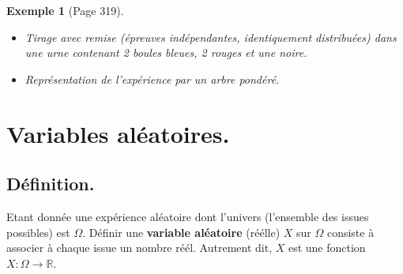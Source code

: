 \documentclass[a4paper,11pt]{article}
\theoremstyle{break}
\newcounter{enonce}
\newtheorem{exemple}[enonce]{Exemple}
\begin{document}
    \begin{exemple}[Page 319]
   
   \begin{itemize}
    \item Tirage avec remise (épreuves indépendantes, identiquement distribuées)
    dans une urne contenant 2 boules bleues, 2 rouges et une noire.

  \item Représentation de l'expérience par un arbre pondéré.

   \end{itemize}
  \end{exemple}

 \section{Variables aléatoires.}
  
  \subsection{Définition.}
  
  
   \begin{definition}
      Etant donnée une expérience aléatoire dont l'univers (l'ensemble des issues possibles) est 
      $\Omega$. Définir une \textbf{variable aléatoire} (réélle) $X$ sur $\Omega$ consiste à associer à
      chaque issue un nombre réél. Autrement dit, $X$ est une fonction $X:\Omega \to \mathbb{R}$.
   \end{definition}
  
\end{document}
